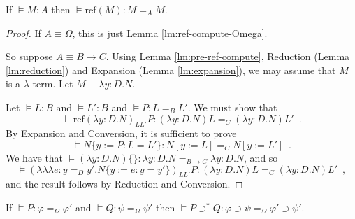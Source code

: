 \documentclass[a4paper,UKenglish]{lipics-v2016}
\newcommand*{\reff}[1]{\ensuremath{\mathrm{ref} \left( {#1} \right)}}
\newcommand*{\triplelambda}{\ensuremath{\lambda \!\! \lambda \!\! \lambda}}
\theoremstyle{plain}
\theoremstyle{definition}
\begin{document}
\begin{lemma}
\label{lm:ref-compute}
If $\models M : A$ then $\models \reff{M} : M =_A M$.
\end{lemma}

\begin{proof}
If $A \equiv \Omega$, this is just Lemma \ref{lm:ref-compute-Omega}.

So suppose $A \equiv B \rightarrow C$.  Using Lemma \ref{lm:pre-ref-compute}, Reduction (Lemma \ref{lm:reduction}) and Expansion (Lemma \ref{lm:expansion}),
we may assume that $M$ is a $\lambda$-term.  Let $M \equiv \lambda y:D.N$.

Let $\models L : B$ and $\models L' : B$ and $\models P : L =_B L'$.  We must show that
\[ \models \reff{\lambda y:D.N}_{L L'} P : (\lambda y:D.N)L =_C (\lambda y:D.N)L' \enspace . \]
By Expansion and Conversion, it is sufficient to prove
\[ \models N \{ y := P : L = L' \} : N [ y:= L ] =_C N [y := L'] \enspace . \]
We have that $\models (\lambda y:D.N)\{\} : \lambda y:D.N =_{B \rightarrow C} \lambda y:D.N$, and so
\[ \models (\triplelambda e : y =_D y' . N \{ y := e : y = y' \})_{L L'} P : (\lambda y:D.N)L =_C (\lambda y:D.N)L' \enspace , \]
and the result follows by Reduction and Conversion.
\end{proof}

\begin{lemma}
\label{lm:compute-supset*}
If $\models P : \varphi =_\Omega \varphi'$ and $\models Q : \psi =_\Omega \psi'$ then $\models P \supset^* Q : \varphi \supset \psi =_\Omega \varphi' \supset \psi'$.
\end{lemma}
\end{document}
